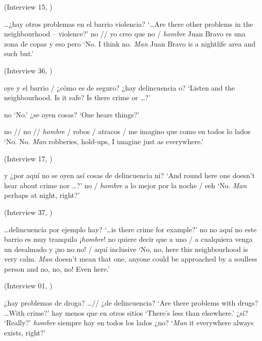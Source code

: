 \begin{exe}
\ex \label{ex:hombrePRESEEAcopas} (Interview 15, \cite{PRESEEA.20142020})
	\begin{xlist}[A:]
	\ldots ¿hay otros problemas en el barrio violencia? 
	\glt `\ldots Are there other problems in the neighbourhood -- violence?' 
	no // yo creo que no / \textit{hombre} Juan Bravo es una zona de copas y eso pero 
	\glt `No. I think no. \textit{Man} Juan Bravo is a nightlife area and such but.' 
	\end{xlist}
	
\ex \label{ex:hombrePRESEEAlados} (Interview 36, \cite{PRESEEA.20142020}) 
	\begin{xlist}[A:]
	oye y el barrio / ¿cómo es de seguro? ¿hay delincuencia o? 
	\glt `Listen and the neighbourhood. Is it safe? Is there crime or \ldots?'
	
	no 
	\glt `No.' 
	¿se oyen cosas? 
	\glt `One hears things?'
	
	no // no // \textit{hombre} / robos / atracos  / me imagino que como en todos lo lados 
	\glt `No. No. \textit{Man} robberies, hold-ups, I imagine just as everywhere.'
	\end{xlist}

\ex \label{ex:hombrePRESEEAnoche} (Interview 17, \cite{PRESEEA.20142020}) 
	\begin{xlist}[A:]
	y ¿por aquí no se oyen así cosas de delincuencia ni? 
	\glt `And round here one doesn't hear about crime nor \ldots?' 
	no / \textit{hombre} a lo mejor por la noche / eeh 
	\glt `No. \textit{Man} perhaps at night, right?' 
	\end{xlist}

\ex \label{ex:hombrePRESEEAdesalmado} (Interview 37, \cite{PRESEEA.20142020}) 
	\begin{xlist}[A:]
	\ldots delincuencia por ejemplo hay? 
	\glt `\ldots is there crime for example?' 
	no no aquí no este barrio es muy tranquilo ¡\textit{hombre}! no quiere decir que a uno / a cualquiera venga un desalmado y ¡no no no! / aquí inclusive 
	\glt `No, no, here this neighbourhood is very calm. \textit{Man} doesn't mean that one, anyone could be approached by a soulless person and no, no, no! Even here.' 
	\end{xlist}
	

\ex \label{ex:hombrePRESEEAsiempre} (Interview 01, \cite{PRESEEA.20142020})
	\begin{xlist}[A:]
	¿hay  problemas de droga? \ldots // ¿de delincuencia? 
	\glt `Are there problems with drugs? \ldots With crime?' 
	hay menos que en otros sitios 
	\glt `There's less than elsewhere.' 
	 ¿sí? 
	\glt `Really?' 
	\textit{hombre} siempre hay en todos los lados ¿no?  
	\glt `\textit{Man} it everywhere always exists, right?' 
	\end{xlist}
\end{exe}

